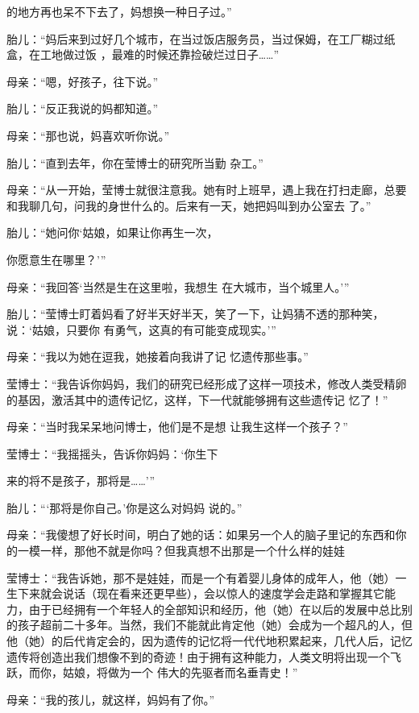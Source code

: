 \documentclass{article}
\begin{document}
\newpage
的地方再也呆不下去了，妈想换一种日子过。” 

胎儿：“妈后来到过好几个城市，在当过饭店服务员，当过保姆，在工厂糊过纸盒，在工地做过饭
，最难的时候还靠捡破烂过日子……” 


母亲：“嗯，好孩子，往下说。” 


胎儿：“反正我说的妈都知道。” 


母亲：“那也说，妈喜欢听你说。” 

胎儿：“直到去年，你在莹博士的研究所当勤
杂工。” 

母亲：“从一开始，莹博士就很注意我。她有时上班早，遇上我在打扫走廊，总要和我聊几句，问我的身世什么的。后来有一天，她把妈叫到办公室去
了。” 

胎儿：“她问你‘姑娘，如果让你再生一次，

\newpage
你愿意生在哪里？’” 

母亲：“我回答‘当然是生在这里啦，我想生
在大城市，当个城里人。’” 

胎儿：“莹博士盯着妈看了好半天好半天，笑了一下，让妈猜不透的那种笑，说：‘姑娘，只要你
有勇气，这真的有可能变成现实。’” 

母亲：“我以为她在逗我，她接着向我讲了记
忆遗传那些事。” 

莹博士：“我告诉你妈妈，我们的研究已经形成了这样一项技术，修改人类受精卵的基因，激活其中的遗传记忆，这样，下一代就能够拥有这些遗传记
忆了！” 

母亲：“当时我呆呆地问博士，他们是不是想
让我生这样一个孩子？” 

莹博士：“我摇摇头，告诉你妈妈：‘你生下

\newpage
来的将不是孩子，那将是……’” 

胎儿：“‘那将是你自己。’你是这么对妈妈
说的。” 

母亲：“我傻想了好长时间，明白了她的话：如果另一个人的脑子里记的东西和你的一模一样，那他不就是你吗？但我真想不出那是一个什么样的娃娃

莹博士：“我告诉她，那不是娃娃，而是一个有着婴儿身体的成年人，他（她）一生下来就会说话（现在看来还更早些），会以惊人的速度学会走路和掌握其它能力，由于已经拥有一个年轻人的全部知识和经历，他（她）在以后的发展中总比别的孩子超前二十多年。当然，我们不能就此肯定他（她）会成为一个超凡的人，但他（她）的后代肯定会的，因为遗传的记忆将一代代地积累起来，几代人后，记忆遗传将创造出我们想像不到的奇迹！由于拥有这种能力，人类文明将出现一个飞跃，而你，姑娘，将做为一个
伟大的先驱者而名垂青史！” 

母亲：“我的孩儿，就这样，妈妈有了你。”
\newpage
\end{document}
